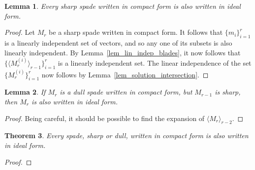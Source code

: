 \documentclass{birkjour}
\newtheorem{thm}{Theorem}[section]
\newtheorem{lem}[thm]{Lemma}
\theoremstyle{definition}
\theoremstyle{remark}
\numberwithin{equation}{section}
\begin{document}
\begin{lem}\label{lem_lin_indep_sharp_blades}
Every sharp spade written in compact form is also written in ideal form.
\end{lem}
\begin{proof}
Let $M_r$ be a sharp spade written in compact form.  It follows that
$\{m_i\}_{i=1}^r$ is a linearly independent set of vectors, and so any
one of its subsets is also linearly independent.  By Lemma~\ref{lem_lin_indep_blades},
it now follows that $\{\langle M_r^{(i)}\rangle_{r-1}\}_{i=1}^r$ is a linearly independent set.
The linear independence of the set $\{M_r^{(i)}\}_{i=1}^r$ now follows by Lemma~\ref{lem_solution_intersection}.
\end{proof}


\pagebreak
\begin{lem}
If $M_r$ is a dull spade written in compact form, but $M_{r-1}$ is sharp, then
$M_r$ is also written in ideal form.
\end{lem}
\begin{proof}
Being careful, it should be possible to find the expansion of $\langle M_r\rangle_{r-2}$.
\end{proof}

\begin{thm}
Every spade, sharp or dull, written in compact form is also written in ideal form.
\end{thm}
\begin{proof}
\end{proof}
\end{document}

